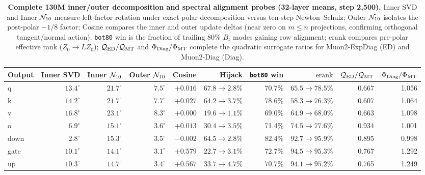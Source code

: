 \begin{table}[tbp]\centering\footnotesize
\setlength{\tabcolsep}{3.2pt}
\caption{\textbf{Complete 130M inner/outer decomposition and spectral alignment probes (32-layer means, step 2,500).} Inner SVD and Inner $\mathcal{N}_{10}$ measure left-factor rotation under exact polar decomposition versus ten-step Newton--Schulz; Outer $\mathcal{N}_{10}$ isolates the post-polar $-1/8$ factor; Cosine compares the inner and outer update deltas (near zero on $m\le n$ projections, confirming orthogonal tangent/normal action). \texttt{bot80} win is the fraction of trailing 80\% $B_t$ modes gaining row alignment; $\mathrm{erank}$ compares pre-polar effective rank ($Z_0\to L Z_0$); $\mathcal Q_{\rm ED}/\mathcal Q_{\rm MT}$ and $\Phi_{\rm Diag}/\Phi_{\rm MT}$ complete the quadratic surrogate ratios for Muon2-ExpDiag (ED) and Muon2-Diag (Diag).}\label{tab:rotation_detail}
\begin{tabularx}{\textwidth}{@{}>{\raggedright\arraybackslash}Xrrrrrrrrr@{}}
\toprule
Output & Inner SVD & Inner $\mathcal{N}_{10}$ & Outer $\mathcal{N}_{10}$ & Cosine & Hijack & \texttt{bot80} win & $\mathrm{erank}$ & $\mathcal Q_{\rm ED}/\mathcal Q_{\rm MT}$ & $\Phi_{\rm Diag}/\Phi_{\rm MT}$ \\
\midrule
q & $13.4^\circ$ & $21.7^\circ$ & $7.5^\circ$ & $+0.016$ & $67.8\to2.8\%$ & 70.7\% & $65.5\to78.5\%$ & 0.667 & 1.056 \\
k & $14.2^\circ$ & $21.7^\circ$ & $7.7^\circ$ & $+0.027$ & $64.2\to3.7\%$ & 78.6\% & $58.3\to76.3\%$ & 0.607 & 1.064 \\
v & $16.8^\circ$ & $23.1^\circ$ & $8.3^\circ$ & $+0.000$ & $19.6\to1.1\%$ & 69.0\% & $64.9\to68.0\%$ & 0.663 & 1.098 \\
o & $6.9^\circ$ & $15.1^\circ$ & $3.6^\circ$ & $+0.013$ & $30.4\to3.5\%$ & 71.4\% & $74.5\to77.6\%$ & 0.934 & 1.001 \\
down & $2.8^\circ$ & $15.3^\circ$ & $3.5^\circ$ & $-0.002$ & $64.5\to2.8\%$ & 82.4\% & $92.7\to95.9\%$ & 0.895 & 0.998 \\
gate & $10.1^\circ$ & $14.1^\circ$ & $3.1^\circ$ & $+0.579$ & $22.7\to3.1\%$ & 72.7\% & $94.5\to95.3\%$ & 0.767 & 1.292 \\
up & $10.3^\circ$ & $14.7^\circ$ & $3.4^\circ$ & $+0.567$ & $33.7\to4.7\%$ & 70.7\% & $94.1\to95.2\%$ & 0.765 & 1.249 \\
\bottomrule\end{tabularx}
\end{table}

